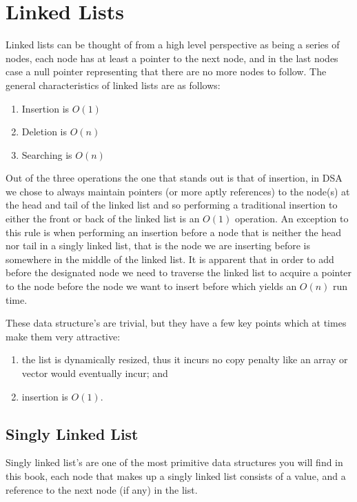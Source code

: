 \chapter{Linked Lists}
Linked lists can be thought of from a high level perspective as being a series of nodes, each node has at least a pointer to the next node, and in the last nodes case a null pointer representing that there are no more nodes to follow.
The general characteristics of linked lists are as follows:

\begin{enumerate}
\item Insertion is $O(1)$
\item Deletion is $O(n)$
\item Searching is $O(n)$
\end{enumerate}

Out of the three operations the one that stands out is that of insertion, in DSA we chose to always maintain pointers (or more aptly references) to the node(s) at the head and tail of the linked list and so performing a traditional insertion to either the front or back of the linked list is an $O(1)$ operation. An exception to this rule is when performing an insertion before a node that is neither the head nor tail in a singly linked list, that is the node we are inserting before is somewhere in the middle of the linked list. It is apparent that in order to add before the designated node we need to traverse the linked list to acquire a pointer to the node before the node we want to insert before which yields an $O(n)$ run time.

These data structure's are trivial, but they have a few key points which at times make them very attractive: 
\begin{enumerate}
\item the list is dynamically resized, thus it incurs no copy penalty like an array or vector would eventually incur; and
\item insertion is $O(1)$.
\end{enumerate}

\section{Singly Linked List} \label{singly_linked_list}
Singly linked list's are one of the most primitive data structures you will find in this book, each node that makes up a singly linked list consists of a value, and a reference to the next node (if any) in the list. 

